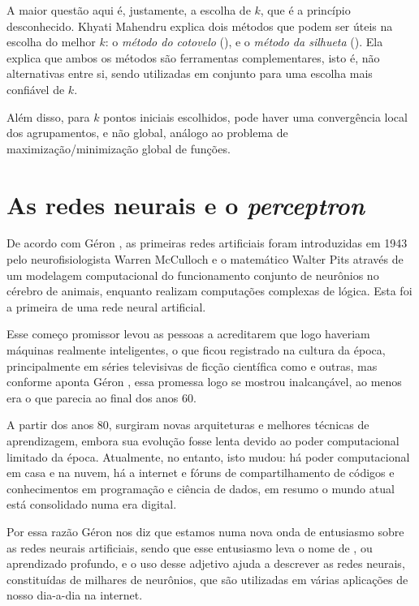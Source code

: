 A maior questão aqui é, justamente, a escolha de $k$, que é a princípio desconhecido. Khyati Mahendru \citep{means} explica dois métodos que podem ser úteis na escolha do melhor $k$: o \emph{método do cotovelo} (), e o \emph{método da silhueta} (). Ela explica que ambos os métodos são ferramentas complementares, isto é, não alternativas entre si, sendo utilizadas em conjunto para uma escolha mais confiável de $k$.

Além disso, para $k$ pontos iniciais escolhidos, pode haver uma convergência local dos agrupamentos, e não global, análogo ao problema de maximização/minimização global de funções.

\section{As redes neurais e o \emph{perceptron}}

De acordo com Géron \citep{hands}, as primeiras redes artificiais foram introduzidas em 1943 pelo neurofisiologista Warren McCulloch e o matemático Walter Pits através de um modelagem computacional do funcionamento conjunto de neurônios no cérebro de animais, enquanto realizam computações complexas de lógica. Esta foi a primeira  de uma rede neural artificial.

Esse começo promissor levou as pessoas a acreditarem que logo haveriam máquinas realmente inteligentes, o que ficou registrado na cultura da época, principalmente em séries televisivas de ficção científica como  e outras, mas conforme aponta Géron \citep{hands}, essa promessa logo se mostrou inalcançável, ao menos era o que parecia ao final dos anos 60. 

A partir dos anos 80, surgiram novas arquiteturas e melhores técnicas de aprendizagem, embora sua evolução fosse lenta devido ao poder computacional limitado da época. Atualmente, no entanto, isto mudou: há poder computacional em casa e na nuvem, há a internet e fóruns de compartilhamento de códigos e conhecimentos em programação e ciência de dados, em resumo o mundo atual está consolidado numa era digital. 

Por essa razão Géron \citep{hands} nos diz que estamos numa nova onda de entusiasmo sobre as redes neurais artificiais, sendo que esse entusiasmo leva o nome de , ou aprendizado profundo, e o uso desse adjetivo ajuda a descrever as redes neurais, constituídas de milhares de neurônios, que são utilizadas em várias aplicações de nosso dia-a-dia na internet.

